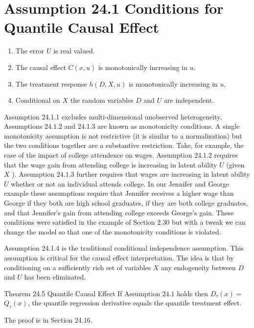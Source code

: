 \documentclass[10pt]{article}
\begin{document}
\section{Assumption 24.1 Conditions for Quantile Causal Effect}
\begin{enumerate}
  \item The error $U$ is real valued.

  \item The causal effect $C(x, u)$ is monotonically increasing in $u$.

  \item The treatment response $h(D, X, u)$ is monotonically increasing in $u$.

  \item Conditional on $X$ the random variables $D$ and $U$ are independent.

\end{enumerate}
Assumption 24.1.1 excludes multi-dimensional unobserved heterogeneity. Assumptions $24.1 .2$ and 24.1.3 are known as monotonicity conditions. A single monotonicity assumption is not restrictive (it is similar to a normalization) but the two conditions together are a substantive restriction. Take, for example, the case of the impact of college attendence on wages. Assumption 24.1.2 requires that the wage gain from attending college is increasing in latent ability $U$ (given $X$ ). Assumption $24.1 .3$ further requires that wages are increasing in latent ability $U$ whether or not an individual attends college. In our Jennifer and George example these assumptions require that Jennifer receives a higher wage than George if they both are high school graduates, if they are both college graduates, and that Jennifer's gain from attending college exceeds George's gain. These conditions were satisfied in the example of Section $2.30$ but with a tweak we can change the model so that one of the monotonicity conditions is violated.

Assumption 24.1.4 is the traditional conditional independence assumption. This assumption is critical for the causal effect interpretation. The idea is that by conditioning on a sufficiently rich set of variables $X$ any endogeneity between $D$ and $U$ has been eliminated.

Theorem 24.5 Quantile Causal Effect If Assumption $24.1$ holds then $D_{\tau}(x)=$ $Q_{\tau}(x)$, the quantile regression derivative equals the quantile treatment effect.

The proof is in Section 24.16.
\end{document}
